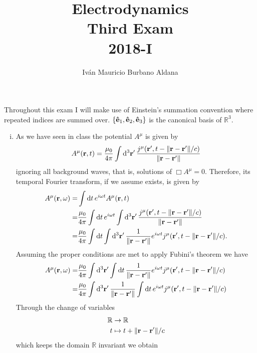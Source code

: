 \documentclass{article}
\title{Electrodynamics\\
Third Exam\\
2018-I}
\author{Iván Mauricio Burbano Aldana}
\begin{document}
\maketitle

Throughout this exam I will make use of Einstein's summation convention where repeated indices are summed over. $\{\vu{e}_1,\vu{e}_2,\vu{e}_3\}$ is the canonical basis of $\mathbb{R}^3$.

\begin{enumerate}[(i)]

\item As we have seen in class the potential $A^\mu$ is given by
\begin{equation}
A^\mu(\vb{r},t)=\frac{\mu_0}{4\pi}\int \dd[3]{\vb{r}'}\frac{j^\mu(\vb{r}',t-\|\vb{r}-\vb{r}'\|/c)}{\|\vb{r}-\vb{r}'\|}
\end{equation}
ignoring all background waves, that is, solutions of $\Box A^\mu=0$. Therefore, its temporal Fourier transform, if we assume exists, is given by
\begin{align}
\begin{split}
A^\mu(\vb{r},\omega)=&\int\dd{t}e^{i\omega t}A^\mu(\vb{r},t)\\
=&\frac{\mu_0}{4\pi}\int\dd{t}e^{i\omega t}\int \dd[3]{\vb{r}'}\frac{j^\mu(\vb{r}',t-\|\vb{r}-\vb{r}'\|/c)}{\|\vb{r}-\vb{r}'\|}\\
=&\frac{\mu_0}{4\pi}\int\dd{t}\int\dd[3]{\vb{r}'}\frac{1}{\|\vb{r}-\vb{r}'\|}e^{i\omega t}j^\mu(\vb{r}',t-\|\vb{r}-\vb{r}'\|/c).
\end{split}
\end{align}
Assuming the proper conditions are met to apply Fubini's theorem we have
\begin{align}
\begin{split}
A^\mu(\vb{r},\omega)=&\frac{\mu_0}{4\pi}\int\dd[3]{\vb{r}'}\int\dd{t}\frac{1}{\|\vb{r}-\vb{r}'\|}e^{i\omega t}j^\mu(\vb{r}',t-\|\vb{r}-\vb{r}'\|/c)\\
=&\frac{\mu_0}{4\pi}\int \dd[3]{\vb{r}'}\frac{1}{\|\vb{r}-\vb{r}'\|}\int\dd{t}e^{i\omega t}j^\mu(\vb{r}',t-\|\vb{r}-\vb{r}'\|/c)
\end{split}
\end{align}
Through the change of variables
\begin{align}
\begin{split}
\mathbb{R}&\rightarrow\mathbb{R}\\
t&\mapsto t+\|\vb{r}-\vb{r}'\|/c
\end{split}
\end{align}
which keeps the domain $\mathbb{R}$ invariant we obtain

\end{enumerate}
\end{document}
